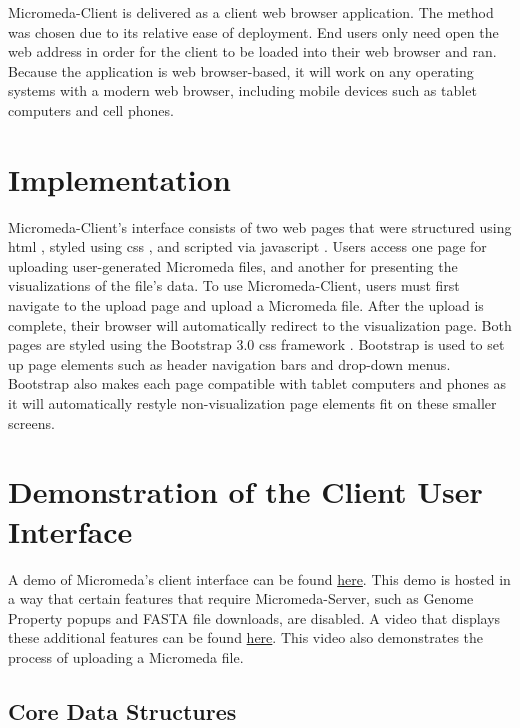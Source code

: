 Micromeda-Client is delivered as a client web browser application. The method was chosen due to its relative ease of deployment. End users only need open the web address in order for the client to be loaded into their web browser and ran. Because the application is web browser-based, it will work on any operating systems with a modern web browser, including mobile devices such as tablet computers and cell phones.

\section{Implementation} \label{client-implementation}

Micromeda-Client's interface consists of two web pages that were structured using \gls{html} \cite{HTML5}, styled using \gls{css} \cite{CSS3}, and scripted via \gls{javascript} \cite{flanagan2006javascript}. Users access one page for uploading user-generated Micromeda files, and another for presenting the visualizations of the file's data. To use Micromeda-Client, users must first navigate to the upload page and upload a Micromeda file. After the upload is complete, their browser will automatically redirect to the visualization page. Both pages are styled using the Bootstrap 3.0 \gls{css} framework \cite{spurlock2013bootstrap}. Bootstrap is used to set up page elements such as header navigation bars and drop-down menus. Bootstrap also makes each page compatible with tablet computers and phones as it will automatically restyle non-visualization page elements fit on these smaller screens.

\section{Demonstration of the Client User Interface} \label{client-demo}

A demo of Micromeda’s client interface can be found \href{http://tundra-pear.glitch.me}{here}. This demo is hosted in a way that certain features that require Micromeda-Server, such as Genome Property popups and FASTA file downloads, are disabled. A video that displays these additional features can be found \href{http://drive.google.com/file/d/1AhiiyCJcrLv_NqaTXSuxzuaZ8s0aCUtu/view?usp=sharing}{here}. This video also demonstrates the process of uploading a Micromeda file.

\subsection{Core Data Structures} \label{visual-data-structures}

